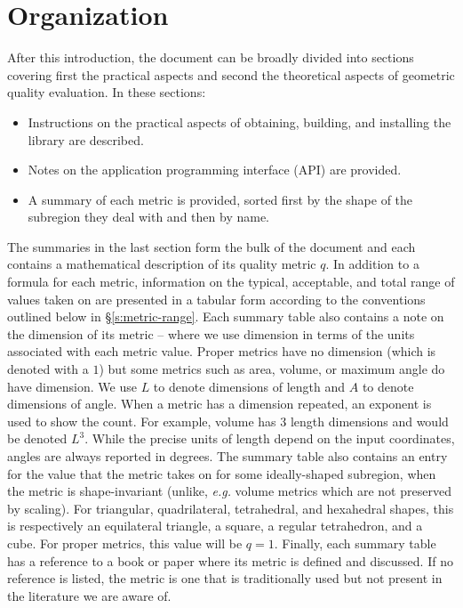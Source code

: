 \section{Organization}

After this introduction, the document can be broadly divided into sections covering
first the practical aspects and
second the theoretical aspects of geometric quality evaluation.
In these sections:
\begin{itemize}
\item Instructions on the practical aspects of obtaining, building, and installing the library are described.
\item Notes on the application programming interface (API) are provided.
\item A summary of each metric is provided, sorted first by the shape of the subregion they deal with and then by name.
\end{itemize}

The summaries in the last section form the bulk of the document and
each contains a mathematical description of its quality metric $q$.
In addition to a formula for each metric, information on the typical, acceptable, and total range
of values taken on are presented in a tabular form according to the conventions outlined below in \S\ref{s:metric-range}.
Each summary table also contains a note on the dimension of its metric -- where we use
dimension in terms of the units associated with each metric value.
Proper metrics have no dimension (which is denoted with a $1$) but some metrics
such as area, volume, or maximum angle do have dimension.
We use $L$ to denote dimensions of length and $A$ to denote dimensions of angle.
When a metric has a dimension repeated, an exponent is used to show the count.
For example, volume has 3 length dimensions and would be denoted $L^3$.
While the precise units of length depend on the input coordinates,
angles are always reported in degrees.
The summary table also contains an entry for the value that the metric takes on for some
ideally-shaped subregion, when the metric is shape-invariant (unlike,
\emph{e.g.} volume metrics which are not preserved by scaling). For
triangular, quadrilateral, tetrahedral, and hexahedral shapes, this is
respectively an equilateral triangle, a square, a regular tetrahedron,
and a cube. For proper metrics, this value will be $q = 1$.
Finally, each summary table has a reference to a book or paper where its metric is defined and discussed.
If no reference is listed, the metric is one that is traditionally used but not present
in the literature we are aware of.

